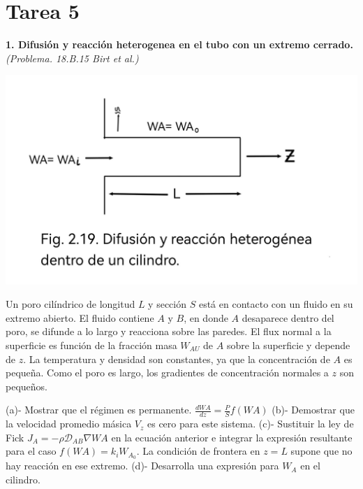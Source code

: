 \section*{Tarea 5}
\textbf{1. Difusión y reacción heterogenea en el tubo con un extremo cerrado.} \textit{(Problema. 18.B.15 Birt et al.)}
\flushleft
\begin{minipage}{0.4\textwidth} %
    \includegraphics[width=\linewidth]{./Capitulo2/Imagenes/imagen-7.jpg} %
\end{minipage}
\hfill %
\begin{minipage}{0.5\textwidth} %
Un poro cilíndrico de longitud \( L \) y sección \( S \) está en contacto con un fluido en su extremo abierto. El fluido contiene \( A \) y \( B \),  en donde \( A \) desaparece dentro del poro, se difunde a lo largo y reacciona sobre las paredes. El flux normal a la superficie es función de la fracción masa \( W_{AU} \) de \( A \) sobre la superficie y depende de \( z \). La temperatura y densidad son constantes, ya que la concentración de \( A \) es pequeña. Como el poro es largo, los gradientes de concentración normales a \( z \) son pequeños.
\end{minipage}
\flushleft
(a)-  Mostrar que el régimen es permanente.\quad
$
\frac{dWA}{dz} = \frac{P}{S} f(WA)
$
\flushleft
(b)- Demostrar que la velocidad promedio másica \( V_{z} \) es cero para este sistema.
\flushleft
(c)- Sustituir la ley de Fick \( J_A = -\rho \mathscr{D}_{AB} \nabla WA \) en la ecuación anterior e integrar la expresión resultante para el caso \( f(WA) = k_iW_{A_0} \).  La condición de frontera en \( z = L \) supone que no hay reacción en ese extremo.
\flushleft
(d)- Desarrolla una expresión para \( W_A \) en el cilindro.
